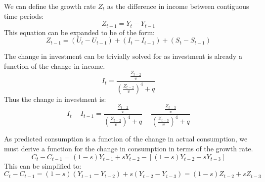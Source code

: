 We can define the growth rate $Z_t$ as the difference in income between contiguous time periods:
\begin{equation}
    Z_{t-1}=Y_t-Y_{t-1}
\end{equation}
This equation can be expanded to be of the form:
\begin{equation*}
    Z_{t-1}=(U_t-U_{t-1})+(I_t-I_{t-1})+(S_t-S_{t-1})
\end{equation*}

The change in investment can be trivially solved for as investment is already a function of the change in income.
\begin{equation*}
    I_t=\frac{\frac{Z_{t-2}}{v}}{\left(\frac{Z_{t-2}}{v}\right)^4+q}
\end{equation*}
Thus the change in investment is:
\begin{equation}
    I_t-I_{t-1}=\frac{\frac{Z_{t-2}}{v}}{\left(\frac{Z_{t-2}}{v}\right)^4+q}-\frac{\frac{Z_{t-3}}{v}}{\left(\frac{Z_{t-3}}{v}\right)^4+q}
\end{equation}

As predicted consumption is a function of the change in actual consumption, we must derive a function for the change in consumption in terms of the growth rate.
\begin{equation*}
    C_t-C_{t-1}=(1-s)Y_{t-1}+sY_{t-2}-[(1-s)Y_{t-2}+sY_{t-3}]
\end{equation*}
This can be simplified to:
\begin{equation}
    C_t-C_{t-1}=(1-s)(Y_{t-1}-Y_{t-2})+s(Y_{t-2}-Y_{t-3})=(1-s)Z_{t-2}+sZ_{t-3}
\end{equation}
